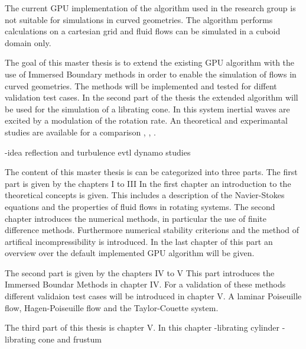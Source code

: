 The current GPU implementation of the algorithm used in the research group is not suitable
for simulations in curved geometries.
The algorithm performs calculations on a cartesian grid and fluid flows can be simulated in a cuboid domain only.

The goal of this master thesis is to extend the existing GPU algorithm with the use of Immersed Boundary methods
in order to enable the simulation of flows in curved  geometries.
The methods will be implemented and tested for diffent validation test cases.
In the second part of the thesis the extended algorithm will be used for the simulation of a librating cone.
In this system inertial waves are excited by a modulation of the rotation rate.
An theoretical and experimantal studies are available for a comparison \citep{Sauret2012}, \citep{Beardsley1970}, \citep{Greenspan1969}.

-idea reflection and turbulence evtl dynamo studies

\bigbreak

The content of this  master thesis is can be categorized into three  parts.
The first part is given by the  chapters \RN{1} to \RN{3}
In the first chapter an introduction to the theoretical concepts is given.
This includes a description of the Navier-Stokes equations and the properties of fluid flows in rotating systems.
The second chapter introduces the numerical methods, in particular the use of finite difference methods.
Furthermore numerical stability criterions and the method of artifical incompressibility is introduced.
In the last chapter of this part an overview over the default implemented GPU algorithm will be given.

The second part is given by the chapters \RN{4} to \RN{5}
This part introduces the Immersed Boundar Methods in chapter \RN{4}.
For a validation of these methods different validaion test cases will be introduced in chapter \RN{5}.
A laminar Poiseuille flow, Hagen-Poiseuille flow and the Taylor-Couette system.

The third part of this thesis is chapter \RN{5}.
In this chapter
-librating cylinder
-librating cone and frustum

%












